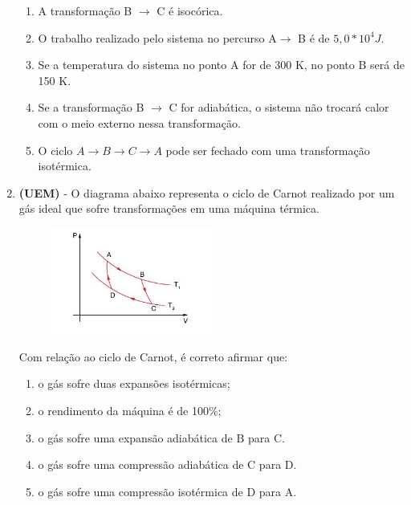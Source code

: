 \documentclass[12pt,letterpaper,fleqn]{article}
\begin{document}
\begin{enumerate}
\begin{enumerate}
    \item A transformação B $\rightarrow$ C é isocórica.
    \item O trabalho realizado pelo sistema no percurso A$\rightarrow$ B é de $5,0 * 10^4 J$.
    \item Se a temperatura do sistema no ponto A for de 300 K, no ponto B será de 150 K.
    \item Se a transformação B $\rightarrow$ C for adiabática, o sistema não trocará calor com o meio externo nessa transformação.
    \item O ciclo $A \rightarrow B \rightarrow C \rightarrow A$ pode ser fechado com uma transformação isotérmica.
\end{enumerate}

\item \textbf{(UEM)} -  O diagrama abaixo representa o ciclo de Carnot realizado por um gás ideal que sofre transformações em uma máquina térmica. 
\begin{figure}[h]
    \centering
    \includegraphics[width=0.5\textwidth]{uem.png}
\end{figure}

Com relação ao ciclo de Carnot, é correto afirmar que:

\begin{enumerate}
    \item o gás sofre duas expansões isotérmicas;
    \item o rendimento da máquina é de 100\%;
    \item o gás sofre uma expansão adiabática de B para C. 
    \item  o gás sofre uma compressão adiabática de C para D.  
    \item o gás sofre uma compressão isotérmica de D para
A.  
\end{enumerate}
\end{enumerate}

\pagebreak
\end{document}

